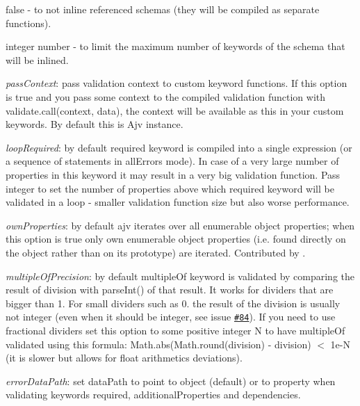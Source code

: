 \begin{DoxyItemize}
\begin{DoxyItemize}
\item {\ttfamily false} -\/ to not inline referenced schemas (they will be compiled as separate functions).
\item integer number -\/ to limit the maximum number of keywords of the schema that will be inlined.
\end{DoxyItemize}
\item {\itshape pass\+Context}\+: pass validation context to custom keyword functions. If this option is {\ttfamily true} and you pass some context to the compiled validation function with {\ttfamily validate.\+call(context, data)}, the {\ttfamily context} will be available as {\ttfamily this} in your custom keywords. By default {\ttfamily this} is Ajv instance.
\item {\itshape loop\+Required}\+: by default {\ttfamily required} keyword is compiled into a single expression (or a sequence of statements in {\ttfamily all\+Errors} mode). In case of a very large number of properties in this keyword it may result in a very big validation function. Pass integer to set the number of properties above which {\ttfamily required} keyword will be validated in a loop -\/ smaller validation function size but also worse performance.
\item {\itshape own\+Properties}\+: by default ajv iterates over all enumerable object properties; when this option is {\ttfamily true} only own enumerable object properties (i.\+e. found directly on the object rather than on its prototype) are iterated. Contributed by .
\item {\itshape multiple\+Of\+Precision}\+: by default {\ttfamily multiple\+Of} keyword is validated by comparing the result of division with parse\+Int() of that result. It works for dividers that are bigger than 1. For small dividers such as 0. the result of the division is usually not integer (even when it should be integer, see issue \href{https://github.com/epoberezkin/ajv/issues/84}{\tt \#84}). If you need to use fractional dividers set this option to some positive integer N to have {\ttfamily multiple\+Of} validated using this formula\+: {\ttfamily Math.\+abs(Math.\+round(division) -\/ division) $<$ 1e-\/N} (it is slower but allows for float arithmetics deviations).
\item {\itshape error\+Data\+Path}\+: set {\ttfamily data\+Path} to point to \textquotesingle{}object\textquotesingle{} (default) or to \textquotesingle{}property\textquotesingle{} when validating keywords {\ttfamily required}, {\ttfamily additional\+Properties} and {\ttfamily dependencies}.

\end{DoxyItemize}
